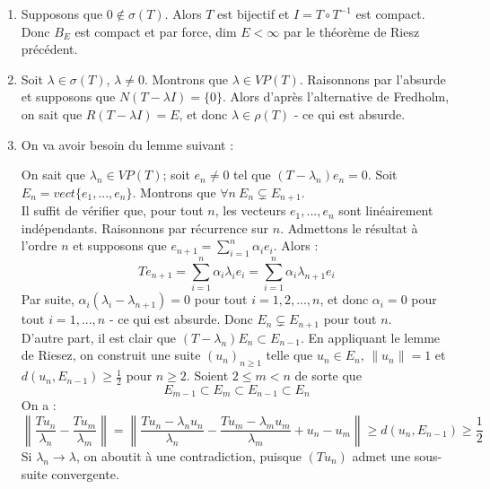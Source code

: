 
\begin{dem}
\begin{enumerate}
	\item Supposons que $0\not\in\sigma(T)$. Alors $T$ est bijectif et $I=T\circ T^{-1}$ est compact. Donc $B_E$ est compact et par force, dim $E<\infty$ par le théorème de Riesz précédent.

	\item Soit $\lambda\in\sigma(T)$, $\lambda\neq 0$. Montrons que $\lambda\in VP(T)$. Raisonnons par l'absurde et supposons que $N(T-\lambda I)=\{0\}$. Alors d'après l'alternative de Fredholm, on sait que $R(T-\lambda I)=E$, et donc $\lambda\in\rho(T)$ - ce qui est absurde.

	\item On va avoir besoin du lemme suivant :

On sait que $\lambda_n\in VP(T)$; soit $e_n\neq 0$ tel que $(T-\lambda_n)e_n=0$. Soit $E_n=vect\{e_1,...,e_n\}$. Montrons que $\forall n\ E_n\subsetneq E_{n+1}$.\\
Il suffit de vérifier que, pour tout $n$, les vecteurs $e_1,...,e_n$ sont linéairement indépendants. Raisonnons par récurrence sur $n$. Admettons le résultat à l'ordre $n$ et supposons que $e_{n+1}=\sum_{i=1}^n \alpha_i e_i$. Alors :
	\[Te_{n+1}=\sum_{i=1}^n \alpha_i\lambda_ie_i=\sum_{i=1}^n \alpha_i\lambda_{n+1}e_i\]
Par suite, $\alpha_i(\lambda_i-\lambda_{n+1})=0$ pour tout $i=1,2,...,n$, et donc $\alpha_i=0$ pour tout $i=1,...,n$ - ce qui est absurde. Donc $E_n\subsetneq E_{n+1}$ pour tout $n$.\\
D'autre part, il est clair que $(T-\lambda_n)E_n\subset E_{n-1}$. En appliquant le lemme de Riesez, on construit une suite $(u_n)_{n\geq 1}$ telle que $u_n\in E_n$, $\|u_n\|=1$ et $d(u_n,E_{n-1})\geq \frac{1}{2}$ pour $n\geq 2$. Soient $2\leq m<n$ de sorte que \[E_{m-1}\subset E_m\subset E_{n-1}\subset E_n\]
On a :
\[\left\| \frac{Tu_n}{\lambda_n}-\frac{Tu_m}{\lambda_m}\right\|=\left\| \frac{Tu_n-\lambda_nu_n}{\lambda_n}-\frac{Tu_m-\lambda_mu_m}{\lambda_m}+u_n-u_m\right\|\geq d(u_n,E_{n-1})\geq \frac{1}{2}\]
Si $\lambda_n\to\lambda$, on aboutit à une contradiction, puisque $(Tu_n)$ admet une sous-suite convergente.


\end{enumerate}
\end{dem}
